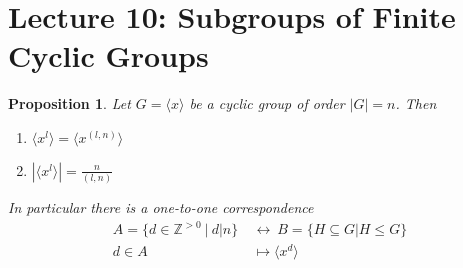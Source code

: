 \documentclass{article}
\newtheorem{theorem}{Proposition}[section]
\theoremstyle{definition}
\theoremstyle{remark}
\begin{document}
\section{Lecture 10: Subgroups of Finite Cyclic Groups}
\begin{theorem}
	\label{subgoffinitecycG1}
	Let $G=\langle x\rangle$ be a cyclic group of order $|G|=n$. Then
	\begin{enumerate}
		\item $\langle x^l\rangle =\langle x^{(l,n)}\rangle$
		\item $|\langle x^l\rangle|=\frac{n}{(l,n)}$
	\end{enumerate}
	In particular there is a one-to-one correspondence
	\begin{align*}
		A=\lbrace d\in\mathbb{Z}^{>0}~|~d|n\rbrace ~ & \leftrightarrow ~B=\lbrace H \subseteq G | H\leq G\rbrace \\
		d\in A                                       & \mapsto\langle x^d\rangle
	\end{align*}
\end{theorem}
\end{document}
